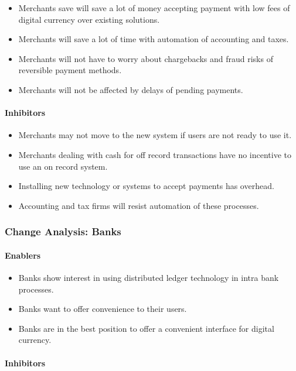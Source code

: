 \documentclass[12pt]{article} %
\begin{document}
{\begin{itemize}
	\item Merchants save will save a lot of money accepting payment with low fees of digital currency over existing solutions.
	\item Merchants will save a lot of time with automation of accounting and taxes.
	\item Merchants will not have to worry about chargebacks and fraud risks of reversible payment methods.
	\item Merchants will not be affected by delays of pending payments.
\end{itemize}

\paragraph*{Inhibitors}

\begin{itemize}
	\item Merchants may not move to the new system if users are not ready to use it.
	\item Merchants dealing with cash for off record transactions have no incentive to use an on record system.
	\item Installing new technology or systems to accept payments has overhead.
	\item Accounting and tax firms will resist automation of these processes.
\end{itemize}

\subsubsection{Change Analysis: Banks} \label{sssec:4.5:banks}

\paragraph*{Enablers}

\begin{itemize}
	\item Banks show interest in using distributed ledger technology in intra bank processes.
	\item Banks want to offer convenience to their users.
	\item Banks are in the best position to offer a convenient interface for digital currency.
\end{itemize}

\paragraph*{Inhibitors}

}
\end{document}
